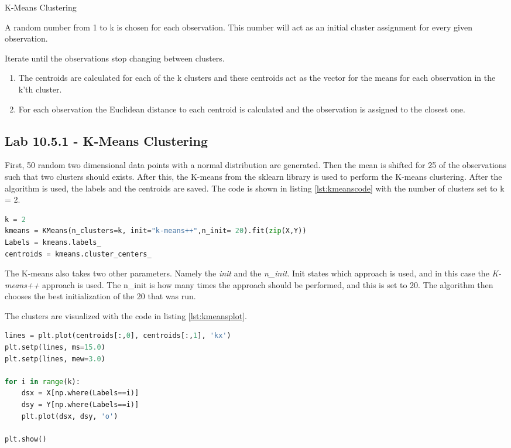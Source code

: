 \begin{algorithm}
	\caption{K-Means Clustering}
	\label{algo:KMeansClustering}
	\begin{algorithmic}[1]
		\State A random number from 1 to k is chosen for each observation. This number will act as an initial cluster assignment for every given observation.
		
		\State 
		Iterate until the observations stop changing between clusters.
		\begin{enumerate}[label=(\alph*)]
			\item The centroids are calculated for each of the k clusters and these centroids act as the vector for the means for each observation in the k'th cluster.
			
			\item For each observation the Euclidean distance to each centroid is calculated and the observation is assigned to the closest one.
		\end{enumerate}
	\end{algorithmic}
\end{algorithm}

\subsection{Lab 10.5.1 - K-Means Clustering}
First, 50 random two dimensional data points with a normal distribution are generated. Then the mean is shifted for 25 of the observations such that two clusters should exists. After this, the K-means from the sklearn library is used to perform the K-means clustering.
After the algorithm is used, the labels and the centroids are saved. The code is shown in listing \ref{lst:kmeanscode} with the number of clusters set to k = 2.
\begin{lstlisting}[language=Python, label=lst:kmeanscode, caption=The KMeans function]
k = 2
kmeans = KMeans(n_clusters=k, init="k-means++",n_init= 20).fit(zip(X,Y))
Labels = kmeans.labels_
centroids = kmeans.cluster_centers_
\end{lstlisting}

The K-means also takes two other parameters. Namely the \emph{init} and the \emph{n\_init}. Init states which approach is used, and in this case the \emph{K-means++} approach is used. The n\_init is how many times the approach should be performed, and this is set to 20. The algorithm then chooses the best initialization of the 20 that was run.

The clusters are visualized with the code in listing \ref{lst:kmeansplot}.
\newpage
\begin{lstlisting}[language=Python, label=lst:kmeansplot, caption=Plotting the two clusters]
lines = plt.plot(centroids[:,0], centroids[:,1], 'kx')
plt.setp(lines, ms=15.0)
plt.setp(lines, mew=3.0)

for i in range(k):
	dsx = X[np.where(Labels==i)]
	dsy = Y[np.where(Labels==i)]
	plt.plot(dsx, dsy, 'o')

plt.show()
\end{lstlisting}

